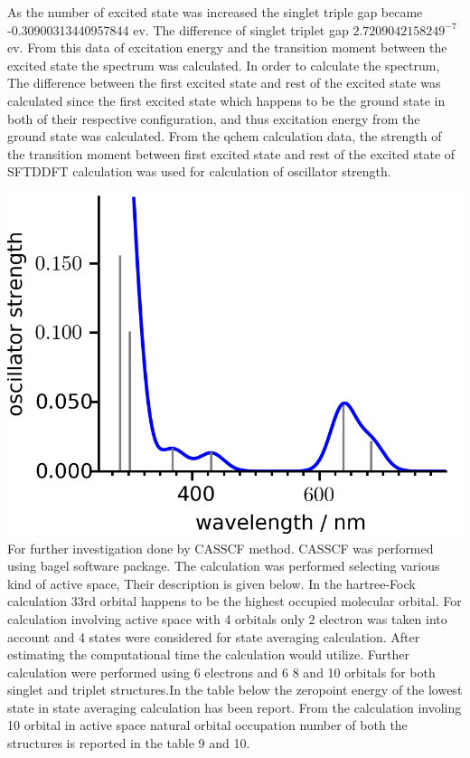 \documentclass{article}
\begin{document}
As the number of excited state was increased the singlet triple gap became -0.30900313440957844 ev. The difference of singlet triplet gap \(2.7209042158249^{-7}\)ev. From this data of excitation energy and the transition moment between the excited state the spectrum was calculated. In order to calculate the spectrum, The difference between the first excited state and rest of the excited state was calculated since the first excited state which happens to be the ground state in both of their respective configuration, and thus excitation energy from the ground state was calculated. From the qchem calculation data, the strength of the transition moment between first excited state and rest of the excited state of SFTDDFT calculation was used for calculation of oscillator strength. 

\includegraphics[scale=0.5]{M1_sin_sfdft_spec.png}\\
For further investigation done by CASSCF method. CASSCF was performed using bagel software package. The calculation was performed selecting various kind of active space, Their description is given below. In the hartree-Fock calculation 33rd orbital happens to be the highest occupied molecular orbital. For calculation involving active space with 4 orbitals only 2 electron was taken into account and 4 states were considered for state averaging calculation. After estimating the computational time the calculation would utilize. Further calculation were performed using 6 electrons and 6 8 and 10 orbitals for both singlet and triplet structures.In the table below the zeropoint energy of the lowest state in state averaging calculation has been report. From the calculation involing 10 orbital in active space natural orbital occupation number of both the structures is reported in the table 9 and 10.
\end{document}
